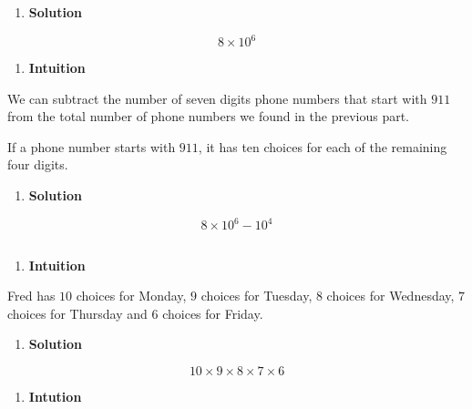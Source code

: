 \documentclass[]{book}
\providecommand{\tightlist}{%
  \setlength{\itemsep}{0pt}\setlength{\parskip}{0pt}}
\begin{document}
\begin{enumerate}
\def\labelenumi{(\alph{enumi})}
\tightlist
\item
  \textbf{Solution}
\end{enumerate}

\[ 8 \times 10^{6} \]

\begin{enumerate}
\def\labelenumi{(\alph{enumi})}
\setcounter{enumi}{1}
\tightlist
\item
  \textbf{Intuition}
\end{enumerate}

We can subtract the number of seven digits phone numbers that start with
\(911\) from the total number of phone numbers we found in the previous
part.

If a phone number starts with \(911\), it has ten choices for each of
the remaining four digits.

\begin{enumerate}
\def\labelenumi{(\alph{enumi})}
\setcounter{enumi}{1}
\tightlist
\item
  \textbf{Solution}
\end{enumerate}

\[ 8 \times 10^{6} - 10^{4} \]

\subsection{}\label{section-2}

\begin{enumerate}
\def\labelenumi{(\alph{enumi})}
\tightlist
\item
  \textbf{Intuition}
\end{enumerate}

Fred has \(10\) choices for Monday, \(9\) choices for Tuesday, \(8\)
choices for Wednesday, \(7\) choices for Thursday and \(6\) choices for
Friday.

\begin{enumerate}
\def\labelenumi{(\alph{enumi})}
\tightlist
\item
  \textbf{Solution}
\end{enumerate}

\[ 10 \times 9 \times 8 \times 7 \times 6 \]

\begin{enumerate}
\def\labelenumi{(\alph{enumi})}
\setcounter{enumi}{1}
\tightlist
\item
  \textbf{Intution}
\end{enumerate}
\end{document}
